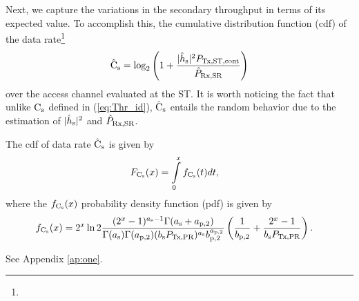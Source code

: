 Next, we capture the variations in the secondary throughput in terms of its expected value. To accomplish this, the cumulative distribution function (cdf) of the data rate\footnote{}
\begin{align}
\hat{\text{{C}}}_{\text{s}}  = \log_2 \left(1 + \frac{|\hat{h}_{\text{s}}|^2 P_{\text{Tx,ST,cont}}}{\hat{P}_{\text{Rx,SR}}} \right) \label{eq:eca}
\end{align}
over the access channel evaluated at the ST. It is worth noticing the fact that unlike $\text{C}_{\text{s}}$ defined in (\ref{eq:Thr_id}), $\hat{\text{{C}}}_{\text{s}}$ entails the random behavior due to the estimation of $|\hat{h}_{\text{s}}|^2$ and $\hat{P}_{\text{Rx,SR}}$.
\begin{lemma} \label{lm:lm5}
\normalfont 
The cdf of data rate $\hat{\text{{C}}}_{\text{s}}$ is given by
\begin{align}
F_{\text{C}_{\text{s}}}(x) &= \int\limits_{0}^{x} f_{\text{C}_{\text{s}}}(t) dt, \label{eq:dis_C} 
\end{align}
where the $f_{\text{C}_{\text{s}}}(x)$ probability density function (pdf) is given by 
\begin{align}
f_{\text{C}_{\text{s}}}(x) &= 2^x \ln 2 \frac{(2^x - 1)^{a_{\text{s}} - 1} \Gamma(a_{\text{s}} + a_{\text{p,2}})}{\Gamma(a_{\text{s}}) \Gamma(a_{\text{p,2}}) (b_{\text{s}} P_{\text{Tx,PR}}) ^{a_{\text{s}}} b_{\text{p,2}}^{a_{\text{p,2}}}} \left(\frac{1}{b_{\text{p,2}}} + \frac{2^x - 1}{b_{\text{s}} P_{\text{Tx,PR}}}\right). \label{eq:den_C}
\end{align}
\end{lemma}
\begin{IEEEproof}
See Appendix \ref{ap:one}.
\end{IEEEproof}

